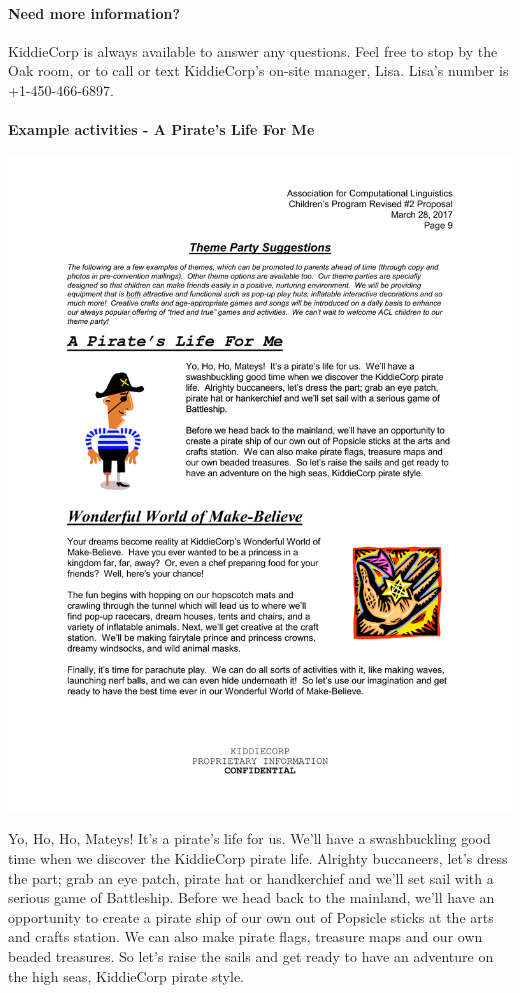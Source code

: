 \paragraph{Need more information?}
KiddieCorp is always available to answer any questions. Feel free to stop by the Oak room, or to call or text KiddieCorp's on-site manager, Lisa.  Lisa's number is +1-450-466-6897.

\paragraph{Example activities - A Pirate's Life For Me}

\includegraphics{pirate.pdf}

Yo, Ho, Ho, Mateys! It's a pirate's life for us. We'll have a swashbuckling good time when we discover the KiddieCorp pirate life. Alrighty buccaneers, let's dress the part; grab an eye patch, pirate hat or handkerchief and we'll set sail with a serious game of Battleship.
Before we head back to the mainland, we'll have an opportunity to create a pirate ship of our own out of Popsicle sticks at the arts and crafts station. We can also make pirate flags, treasure maps and our own beaded treasures. So let's raise the sails and get ready to have an adventure on the high seas, KiddieCorp pirate style.
